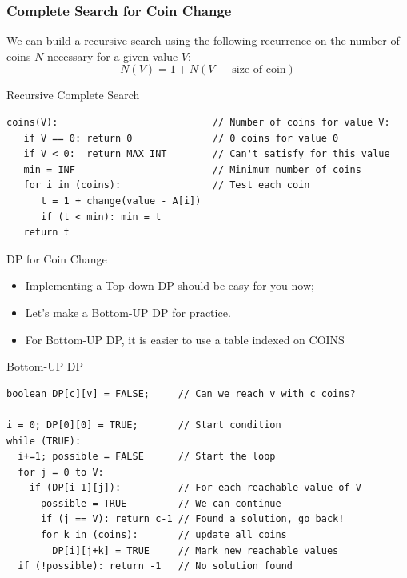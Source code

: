 \begin{frame}[fragile]
  \frametitle{Complete Search for Coin Change}

  We can build a recursive search using the following recurrence on the number of coins $N$ necessary for a given value $V$:
  \[N(V) = 1 + N(V-\text{ size of coin})\]

  \begin{block}{Recursive Complete Search}
    {\smaller
\begin{verbatim}
coins(V):                           // Number of coins for value V:
   if V == 0: return 0              // 0 coins for value 0
   if V < 0:  return MAX_INT        // Can't satisfy for this value
   min = INF                        // Minimum number of coins
   for i in (coins):                // Test each coin
      t = 1 + change(value - A[i])
      if (t < min): min = t
   return t
\end{verbatim}
  }
  \end{block}
\end{frame}

\begin{frame}[fragile]{DP for Coin Change}
  \begin{itemize}
    \item Implementing a Top-down DP should be easy for you now;
    \item Let's make a Bottom-UP DP for practice.
    \item For Bottom-UP DP, it is easier to use a table indexed on COINS
  \end{itemize}

\begin{block}{Bottom-UP DP}
  {\smaller
\begin{verbatim}
boolean DP[c][v] = FALSE;     // Can we reach v with c coins?

i = 0; DP[0][0] = TRUE;       // Start condition
while (TRUE):
  i+=1; possible = FALSE      // Start the loop
  for j = 0 to V:
    if (DP[i-1][j]):          // For each reachable value of V
      possible = TRUE         // We can continue
      if (j == V): return c-1 // Found a solution, go back!
      for k in (coins):       // update all coins
        DP[i][j+k] = TRUE     // Mark new reachable values
  if (!possible): return -1   // No solution found
\end{verbatim}}
\end{block}
\end{frame}

